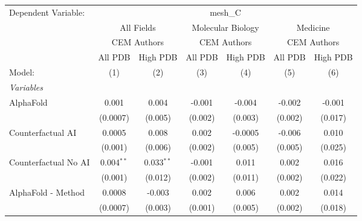 \begingroup
\centering
\begin{tabular}{lcccccc}
   \tabularnewline \midrule \midrule
   Dependent Variable: & \multicolumn{6}{c}{mesh\_C}\\
 & \multicolumn{2}{c}{All Fields} & \multicolumn{2}{c}{Molecular Biology} & \multicolumn{2}{c}{Medicine} \\
\cmidrule(lr){2-3} \cmidrule(lr){4-5} \cmidrule(lr){6-7}
 & \multicolumn{2}{c}{CEM Authors} & \multicolumn{2}{c}{CEM Authors} & \multicolumn{2}{c}{CEM Authors} \\
\cmidrule(lr){2-3} \cmidrule(lr){4-5} \cmidrule(lr){6-7}
 & \multicolumn{1}{c}{All PDB} & \multicolumn{1}{c}{High PDB} & \multicolumn{1}{c}{All PDB} & \multicolumn{1}{c}{High PDB} & \multicolumn{1}{c}{All PDB} & \multicolumn{1}{c}{High PDB} \\
\cmidrule(lr){2-2} \cmidrule(lr){3-3} \cmidrule(lr){4-4} \cmidrule(lr){5-5} \cmidrule(lr){6-6} \cmidrule(lr){7-7}
   Model:                                                     & (1)          & (2)          & (3)     & (4)           & (5)     & (6)\\  
   \midrule
   \emph{Variables}\\
   AlphaFold                                                  & 0.001        & 0.004        & -0.001  & -0.004        & -0.002  & -0.001\\   
                                                              & (0.0007)     & (0.005)      & (0.002) & (0.003)       & (0.002) & (0.017)\\   
   Counterfactual AI                                          & 0.0005       & 0.008        & 0.002   & -0.0005       & -0.006  & 0.010\\   
                                                              & (0.001)      & (0.006)      & (0.002) & (0.005)       & (0.005) & (0.025)\\   
   Counterfactual No AI                                       & 0.004$^{**}$ & 0.033$^{**}$ & -0.001  & 0.011         & 0.002   & 0.016\\   
                                                              & (0.001)      & (0.012)      & (0.002) & (0.011)       & (0.002) & (0.022)\\   
   AlphaFold - Method                                         & 0.0008       & -0.003       & 0.002   & 0.006         & 0.002   & 0.014\\   
                                                              & (0.0007)     & (0.003)      & (0.001) & (0.005)       & (0.002) & (0.018)\\   

\end{tabular}
